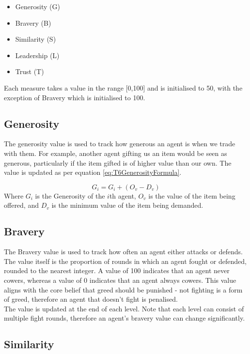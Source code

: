 \begin{itemize}
    \item Generosity (G)
    \item Bravery (B)
    \item Similarity (S)
    \item Leadership (L)
    \item Trust (T)
\end{itemize}

Each measure takes a value in the range [0,100] and is initialised to 50, with the exception of Bravery which is initialised to 100.

\subsection{Generosity}

The generosity value is used to track how generous an agent is when we trade with them. For example, another agent gifting us an item would be seen as generous, particularly if the item gifted is of higher value than our own. The value is updated as per equation \ref{eq:T6GenerosityFormula}.

\begin{equation}\label{eq:T6GenerosityFormula}
    G_{i} = G_{i} + (O_{v} - D_{v})
\end{equation}
Where $G_{i}$ is the Generosity of the $i$th agent, $O_{v}$ is the value of the item being offered, and $D_{v}$ is the minimum value of the item being demanded.

\subsection{Bravery}

The Bravery value is used to track how often an agent either attacks or defends. The value itself is the proportion of rounds in which an agent fought or defended, rounded to the nearest integer. A value of 100 indicates that an agent never cowers, whereas a value of 0 indicates that an agent always cowers. This value aligns with the core belief that greed should be punished - not fighting is a form of greed, therefore an agent that doesn't fight is penalised.\\

The value is updated at the end of each level. Note that each level can consist of multiple fight rounds, therefore an agent's bravery value can change significantly.

\subsection{Similarity}

